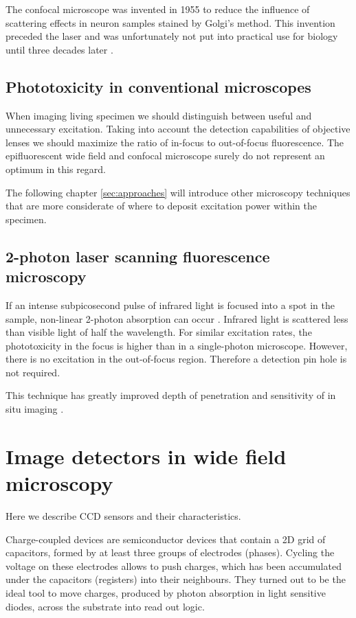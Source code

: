 The confocal microscope was invented in 1955  \citep{Minsky1961,Minsky1988} to reduce the influence of
scattering effects in neuron samples stained by Golgi's method. This
invention preceded the laser and was unfortunately not put into
practical use for biology until three decades later \citep{Amos1987}.
\subsection{Phototoxicity in conventional microscopes}
When imaging living specimen we should distinguish between useful and
unnecessary excitation. Taking into account the detection capabilities
of objective lenses we should maximize the ratio of in-focus to
out-of-focus fluorescence. The epifluorescent wide field and confocal
microscope surely do not represent an optimum in this regard.

The following chapter \ref{sec:approaches} will introduce other
microscopy techniques that are more considerate of where to deposit
excitation power within the specimen.
\subsection{2-photon laser scanning fluorescence microscopy}
If an intense subpicosecond pulse of infrared light is focused into a
spot in the sample, non-linear 2-photon absorption can occur
\citep{Denk1990}. Infrared light is scattered less than visible light
of half the wavelength. For similar excitation rates, the
phototoxicity in the focus is higher than in a single-photon
microscope. However, there is no excitation in the out-of-focus
region. Therefore a detection pin hole is not required.

This technique has greatly improved depth of penetration and
sensitivity of in situ imaging
\citep{Otsu2008}. %
\section{Image detectors in wide field microscopy}
\label{sec:ccd-intro}
\begin{summary}
  Here we describe CCD
  sensors and their characteristics.
\end{summary}
Charge-coupled devices are semiconductor devices that contain a 2D
grid of capacitors, formed by at least three groups of electrodes
(phases). Cycling the voltage on these electrodes allows to push
charges, which has been accumulated under the capacitors (registers)
into their neighbours. They turned out to be the ideal tool to move
charges, produced by photon absorption in light sensitive diodes,
across the substrate into read out logic.

